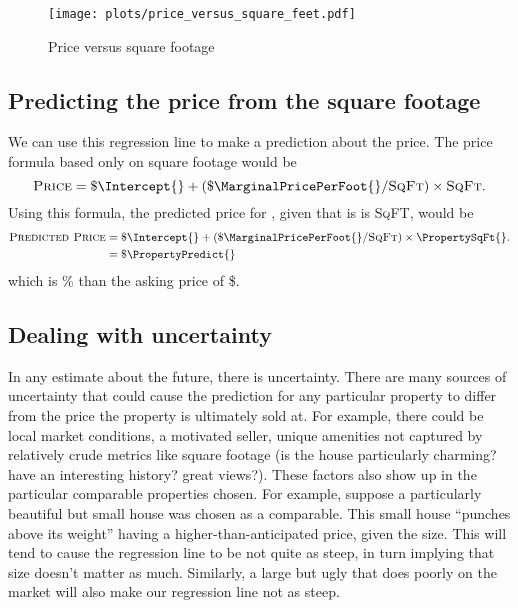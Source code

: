 \documentclass[
10pt, %
a4paper, %
oneside, %
headinclude,footinclude, %
BCOR5mm, %
]{scrartcl}
\begin{document}
\begin{figure}
\centering
\caption{Price versus square footage} \label{fig:price_versus_square_feet}  
\texttt{[image: plots/price\_versus\_square\_feet.pdf]} 
\end{figure}

\subsection{Predicting the price from the square footage} 
We can use this regression line to make a prediction about the price. 
The price formula based only on square footage would be
\begin{equation}
  \textsc{Price} = \$ \Intercept{} + (\$ \MarginalPricePerFoot{}/\textsc{SqFt}) \times \textsc{SqFt}. \nonumber
\end{equation}
Using this formula, the predicted price for \PropertyName{}, given that is is \PropertySqFt{} \textsc{SqFT}, would be
\begin{align}
\textsc{Predicted Price} & = \$ \Intercept{} + (\$ \MarginalPricePerFoot{}/\textsc{SqFt}) \times \PropertySqFt{}. \\ \nonumber
                         & = \$ \PropertyPredict{} \nonumber 
\end{align}
which is \PctDiff{}\% \ComparePredictedToActual{} than the asking price of \$\PropertyPrice{}.

\subsection{Dealing with uncertainty} 
In any estimate about the future, there is uncertainty.
There are many sources of uncertainty that could cause the prediction for any particular property to differ from the price the property is ultimately sold at.
For example, there could be local market conditions, a motivated seller, unique amenities not captured by relatively crude metrics like square footage (is the house particularly charming? have an interesting history? great views?). 
These factors also show up in the particular comparable properties chosen.
For example, suppose a particularly beautiful but small house was chosen as a comparable.
This small house ``punches above its weight'' having a higher-than-anticipated price, given the size.
This will tend to cause the regression line to be not quite as steep, in turn implying that size doesn't matter as much.
Similarly, a large but ugly that does poorly on the market will also make our regression line not as steep.
\end{document}
